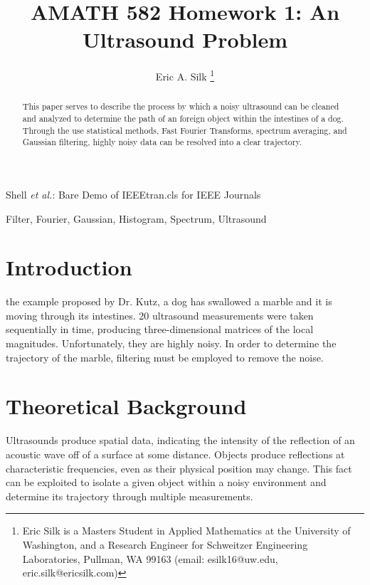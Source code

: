 \documentclass[journal]{IEEEtran}
\begin{document}
\title{AMATH 582 Homework 1: An Ultrasound Problem}

\author{Eric A. Silk
\thanks{Eric Silk is a Masters Student in Applied Mathematics at the University of Washington,
		and a Research Engineer for Schweitzer Engineering Laboratories, Pullman, WA 99163 (email: esilk16@uw.edu, eric.silk@ericsilk.com)}
}

{Shell \MakeLowercase{\textit{et al.}}: Bare Demo of IEEEtran.cls for IEEE Journals}
\maketitle

\begin{abstract}
This paper serves to describe the process by which a noisy ultrasound can be cleaned and analyzed to determine the path of an foreign object within the intestines of a dog. Through the use statistical methods, Fast Fourier Transforms, spectrum averaging, and Gaussian filtering, highly noisy data can be resolved into a clear trajectory.
\end{abstract}

\begin{IEEEkeywords}
Filter, Fourier, Gaussian, Histogram, Spectrum, Ultrasound
\end{IEEEkeywords}


\IEEEpeerreviewmaketitle



\section{Introduction}

 the example proposed by Dr. Kutz, a dog has swallowed a marble and it is moving through its intestines. 20 ultrasound measurements were taken sequentially in time, producing three-dimensional matrices of the local magnitudes. Unfortunately, they are highly noisy. In order to determine the trajectory of the marble, filtering must be employed to remove the noise.

\section{Theoretical Background}
Ultrasounds produce spatial data, indicating the intensity of the reflection of an acoustic wave off of a surface at some distance. Objects produce reflections at characteristic frequencies, even as their physical position may change. This fact can be exploited to isolate a given object within a noisy environment and determine its trajectory through multiple measurements.
\end{document}
